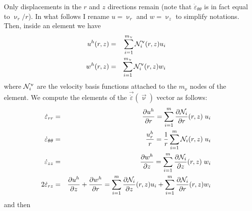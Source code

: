 Only displacements in the $r$ and $z$ directions remain (note that $\dot\varepsilon_{\theta\theta}$ 
is in fact equal to $\upnu_r/r$). In what follows I rename $u=\upnu_r$ and $w=\upnu_z$ to simplify notations. 
Then, inside an element we have 
\begin{eqnarray}
u^h(r,z) &=& \sum_{i=1}^{m_\upnu} {\mathcal{N}}_i^\upnu(r,z) u_i \\
w^h(r,z) &=& \sum_{i=1}^{m_\upnu} {\mathcal{N}}_i^\upnu(r,z) w_i
\end{eqnarray}
where ${\mathcal{N}}_i^\upnu$ are the velocity basis functions attached 
to the $m_\upnu$ nodes of the element.
We compute the elements of the $\vec{\dot{\varepsilon}}(\vec\upnu)$ vector as follows:
\begin{eqnarray}
\dot\varepsilon_{rr} &=&
\frac{\partial u^h}{\partial r} 
= \sum_{i=1}^m \frac{\partial {\mathcal{N}}_i}{\partial r}(r,z) \; u_i \\
\dot\varepsilon_{\theta\theta} &=& \frac{u_r^h}{r} = 
\frac{1}{r}\sum_{i=1}^m {\mathcal{N}}_i(r,z) \;  u_i \\
\dot\varepsilon_{zz} &=& 
\frac{\partial w^h}{\partial z}
= \sum_{i=1}^m \frac{\partial {\mathcal{N}}_i}{\partial z}(r,z) \; w_i \\
2\dot\varepsilon_{rz} &=& \frac{\partial u^h}{\partial z}
+ \frac{\partial w^h}{\partial r}
= \sum_{i=1}^m \frac{\partial {\mathcal{N}}_i}{\partial z}(r,z) u_i 
+ \sum_{i=1}^m \frac{\partial {\mathcal{N}}_i}{\partial r}(r,z) w_i 
\end{eqnarray}
and then 
